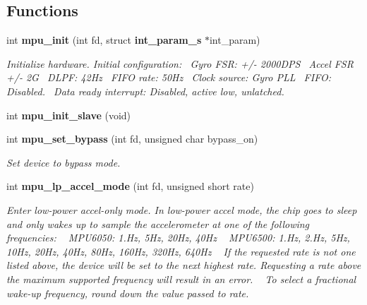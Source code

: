 \subsection*{Functions}
\begin{DoxyCompactItemize}
\item 
int \textbf{ mpu\+\_\+init} (int fd, struct \textbf{ int\+\_\+param\+\_\+s} $\ast$int\+\_\+param)
\begin{DoxyCompactList}\small\item\em Initialize hardware. Initial configuration\+:~\newline
Gyro F\+SR\+: +/-\/ 2000\+D\+PS~\newline
Accel F\+SR +/-\/ 2G~\newline
D\+L\+PF\+: 42\+Hz~\newline
F\+I\+FO rate\+: 50\+Hz~\newline
Clock source\+: Gyro P\+LL~\newline
F\+I\+FO\+: Disabled.~\newline
Data ready interrupt\+: Disabled, active low, unlatched. \end{DoxyCompactList}\item 
int \textbf{ mpu\+\_\+init\+\_\+slave} (void)
\item 
int \textbf{ mpu\+\_\+set\+\_\+bypass} (int fd, unsigned char bypass\+\_\+on)
\begin{DoxyCompactList}\small\item\em Set device to bypass mode. \end{DoxyCompactList}\item 
int \textbf{ mpu\+\_\+lp\+\_\+accel\+\_\+mode} (int fd, unsigned short rate)
\begin{DoxyCompactList}\small\item\em Enter low-\/power accel-\/only mode. In low-\/power accel mode, the chip goes to sleep and only wakes up to sample the accelerometer at one of the following frequencies\+: ~\newline
 M\+P\+U6050\+: 1.\+Hz, 5\+Hz, 20\+Hz, 40\+Hz ~\newline
 M\+P\+U6500\+: 1.\+Hz, 2.\+Hz, 5\+Hz, 10\+Hz, 20\+Hz, 40\+Hz, 80\+Hz, 160\+Hz, 320\+Hz, 640\+Hz ~\newline
 If the requested rate is not one listed above, the device will be set to the next highest rate. Requesting a rate above the maximum supported frequency will result in an error. ~\newline
 To select a fractional wake-\/up frequency, round down the value passed to {\itshape rate}. \end{DoxyCompactList}\item 

\end{DoxyCompactItemize}
